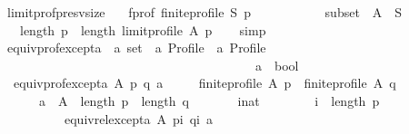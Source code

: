 \begin{isabellebody}
\ limit{\isacharunderscore}{\kern0pt}prof{\isacharunderscore}{\kern0pt}presv{\isacharunderscore}{\kern0pt}size{\isacharcolon}{\kern0pt}\isanewline
\ \ \ f{\isacharunderscore}{\kern0pt}prof{\isacharcolon}{\kern0pt}\ {\isachardoublequoteopen}finite{\isacharunderscore}{\kern0pt}profile\ S\ p{\isachardoublequoteclose}\ \isanewline
\ \ \ \ \ \ \ \ \ \ subset{\isacharcolon}{\kern0pt}\ \ {\isachardoublequoteopen}A\ {\isasymsubseteq}\ S{\isachardoublequoteclose}\isanewline
\ \ \ {\isachardoublequoteopen}length\ p\ {\isacharequal}{\kern0pt}\ length\ {\isacharparenleft}{\kern0pt}limit{\isacharunderscore}{\kern0pt}profile\ A\ p{\isacharparenright}{\kern0pt}{\isachardoublequoteclose}\isanewline
%
\isadelimproof
\ \ %
\endisadelimproof
%
\isatagproof
{}\isamarkupfalse%
\ simp%
\endisatagproof
{\isafoldproof}%
%
\isadelimproof
%
\endisadelimproof
%
\isadelimdocument
%
\endisadelimdocument
%
\isatagdocument
%
\isamarkuptrue%
%
\endisatagdocument
{\isafolddocument}%
%
\isadelimdocument
%
\endisadelimdocument
{}\isamarkupfalse%
\ equiv{\isacharunderscore}{\kern0pt}prof{\isacharunderscore}{\kern0pt}except{\isacharunderscore}{\kern0pt}a\ {\isacharcolon}{\kern0pt}{\isacharcolon}{\kern0pt}\ {\isachardoublequoteopen}{\isacharprime}{\kern0pt}a\ set\ {\isasymRightarrow}\ {\isacharprime}{\kern0pt}a\ Profile\ {\isasymRightarrow}\ {\isacharprime}{\kern0pt}a\ Profile\ {\isasymRightarrow}\isanewline
\ \ \ \ \ \ \ \ \ \ \ \ \ \ \ \ \ \ \ \ \ \ \ \ \ \ \ \ \ \ \ \ \ \ \ \ \ \ \ \ {\isacharprime}{\kern0pt}a\ {\isasymRightarrow}\ bool{\isachardoublequoteclose}\ \isanewline
\ \ {\isachardoublequoteopen}equiv{\isacharunderscore}{\kern0pt}prof{\isacharunderscore}{\kern0pt}except{\isacharunderscore}{\kern0pt}a\ A\ p\ q\ a\ {\isasymequiv}\isanewline
\ \ \ \ finite{\isacharunderscore}{\kern0pt}profile\ A\ p\ {\isasymand}\ finite{\isacharunderscore}{\kern0pt}profile\ A\ q\ {\isasymand}\isanewline
\ \ \ \ \ \ a\ {\isasymin}\ A\ {\isasymand}\ length\ p\ {\isacharequal}{\kern0pt}\ length\ q\ {\isasymand}\isanewline
\ \ \ \ \ \ {\isacharparenleft}{\kern0pt}{\isasymforall}i{\isacharcolon}{\kern0pt}{\isacharcolon}{\kern0pt}nat{\isachardot}{\kern0pt}\isanewline
\ \ \ \ \ \ \ \ i\ {\isacharless}{\kern0pt}\ length\ p\ {\isasymlongrightarrow}\isanewline
\ \ \ \ \ \ \ \ \ \ equiv{\isacharunderscore}{\kern0pt}rel{\isacharunderscore}{\kern0pt}except{\isacharunderscore}{\kern0pt}a\ A\ {\isacharparenleft}{\kern0pt}p{\isacharbang}{\kern0pt}i{\isacharparenright}{\kern0pt}\ {\isacharparenleft}{\kern0pt}q{\isacharbang}{\kern0pt}i{\isacharparenright}{\kern0pt}\ a{\isacharparenright}{\kern0pt}{\isachardoublequoteclose}\isanewline

\end{isabellebody}

